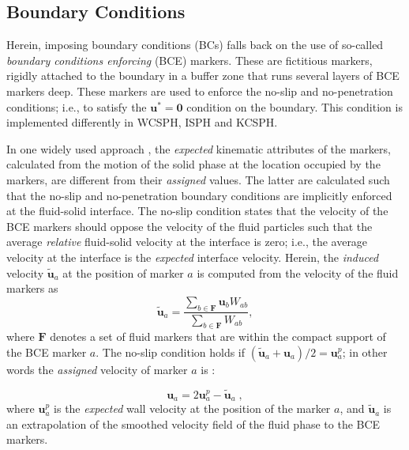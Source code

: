 \subsection{Boundary Conditions}
\label{sec:BC}
Herein, imposing boundary conditions (BCs) falls back on the use of so-called {\textit{boundary conditions enforcing}} (BCE) markers. These are fictitious markers, rigidly attached to the boundary in a buffer zone that runs several layers of BCE markers deep. These markers are used to enforce the no-slip and no-penetration conditions; i.e., to satisfy the $\mathbf{u}^*= \mathbf{0}$ condition on the boundary. This condition is implemented differently in WCSPH, ISPH and KCSPH.


In one widely used approach \cite{Adami2012}, the \textit{expected} kinematic attributes of the markers, calculated from the motion of the solid phase at the location occupied by the markers, are different from their \textit{assigned} values. The latter are calculated such that the no-slip and no-penetration boundary conditions are implicitly enforced at the fluid-solid interface. The no-slip condition states that the velocity of the BCE markers should oppose the velocity of the fluid particles such that the average \textit{relative} fluid-solid velocity at the interface is zero; i.e., the average velocity at the interface is the \textit{expected} interface velocity. Herein, the \textit{induced} velocity $ \tilde{\mathbf{u}}_a$ at the position of marker $a$ is computed from the velocity of the fluid markers as
\begin{equation}\label{eq:BCE_extrapolation}
\tilde{\mathbf{u}}_a = \frac{\sum\limits_{b \in \mathbf{F}} {\mathbf{u}_b W_{ab}}}{\sum\limits_{b \in \mathbf{F}} {W_{ab}}},
\end{equation}
where $\mathbf{F}$ denotes a set of fluid markers that are within the compact support of the BCE marker $a$. The no-slip condition holds if $(\tilde{\mathbf{u}}_a +\mathbf{u}_a)/2=\mathbf{u}_a^p$; in other words the \textit{assigned} velocity of marker $a$ is \cite{Adami2012}:

\begin{equation} \label{eq:vBCE_Adami}
\mathbf{u}_a = 2 \mathbf{u}^{p}_a - \tilde{\mathbf{u}}_a \; ,
\end{equation}
where $\mathbf{u}^{p}_a$ is the \textit{expected} wall velocity at the position of the marker $a$, and $\tilde{\mathbf{u}}_a$ is an extrapolation of the smoothed velocity field of the fluid phase to the BCE markers.


